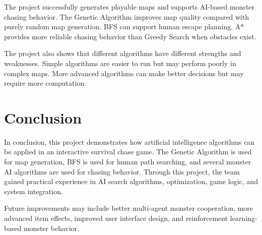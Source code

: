 \documentclass[12pt,a4paper]{article}
\begin{document}
The project successfully generates playable maps and supports AI-based monster chasing behavior. The Genetic Algorithm improves map quality compared with purely random map generation. BFS can support human escape planning. A* provides more reliable chasing behavior than Greedy Search when obstacles exist.

The project also shows that different algorithms have different strengths and weaknesses. Simple algorithms are easier to run but may perform poorly in complex maps. More advanced algorithms can make better decisions but may require more computation.

\section{Conclusion}

In conclusion, this project demonstrates how artificial intelligence algorithms can be applied in an interactive survival chase game. The Genetic Algorithm is used for map generation, BFS is used for human path searching, and several monster AI algorithms are used for chasing behavior. Through this project, the team gained practical experience in AI search algorithms, optimization, game logic, and system integration.

Future improvements may include better multi-agent monster cooperation, more advanced item effects, improved user interface design, and reinforcement learning-based monster behavior.
\end{document}
